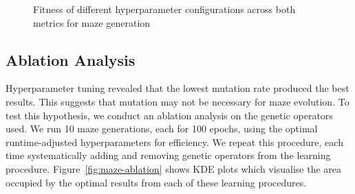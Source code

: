 \begin{figure}[!h]
\centering
            \hfill
            \hfill
            \caption{Fitness of different hyperparameter configurations across both metrics for maze generation}
\label{fig:maze-hyperparam}
\end{figure}


\subsection{Ablation Analysis}
Hyperparameter tuning revealed that the lowest mutation rate produced the best results. This suggests that mutation may not be necessary for maze evolution. To test this hypothesis, we conduct an ablation analysis on the genetic operators used. We run 10 maze generations, each for 100 epochs, using the optimal runtime-adjusted hyperparameters for efficiency. We repeat this procedure, each time systematically adding and removing genetic operators from the learning procedure. Figure~\ref{fig:maze-ablation} shows KDE plots which visualise the area occupied by the optimal results from each of these learning procedures.

